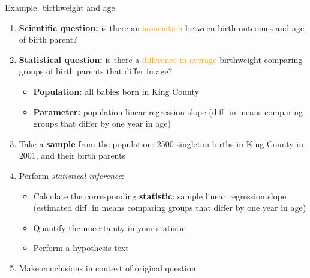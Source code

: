 \documentclass[10pt,t]{beamer}
\begin{document}
\begin{frame}{Example: birthweight and age}
\begin{enumerate}
	\item \textbf{Scientific question:} is there an \textcolor{orange}{association} between birth outcomes and age of birth parent?
	\item \textbf{Statistical question:} is there a \textcolor{orange}{difference in average} birthweight comparing groups of birth parents that differ in age? \pause
	\begin{itemize}
		\item \textbf{Population:} all babies born in King County
		\item \textbf{Parameter:} population linear regression slope (diff. in means comparing groups that differ by one year in age) \pause
	\end{itemize}
	\item Take a \textbf{sample} from the population: 2500 singleton births in King County in 2001, and their birth parents \pause
	\item Perform \textit{statistical inference}:
	\begin{itemize}
		\item Calculate the corresponding \textbf{statistic}: sample linear regression slope (estimated diff. in means comparing groups that differ by one year in age)\pause
		\item Quantify the uncertainty in your statistic
		\item Perform a hypothesis text
	\end{itemize} \pause
	\item Make conclusions in context of original question
\end{enumerate}
\end{frame}
\end{document}
